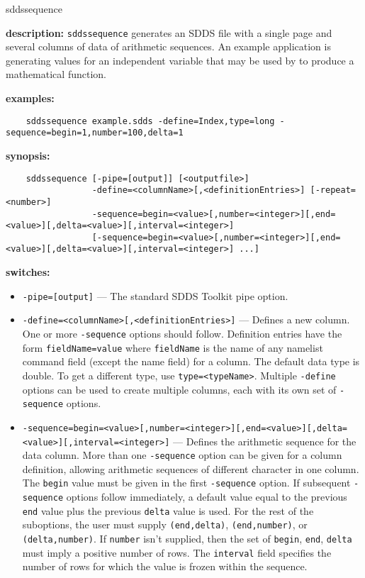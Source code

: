 \begin{sddsprog}{sddssequence}
  \item \textbf{description:} \verb|sddssequence| generates an SDDS file with a single page and several columns of data of arithmetic sequences. An example application is generating values for an independent variable that may be used by  to produce a mathematical function.
  \item \textbf{examples:}
    \begin{verbatim}
    sddssequence example.sdds -define=Index,type=long -sequence=begin=1,number=100,delta=1
    \end{verbatim}
  \item \textbf{synopsis:}
    \begin{verbatim}
    sddssequence [-pipe=[output]] [<outputfile>]
                 -define=<columnName>[,<definitionEntries>] [-repeat=<number>]
                 -sequence=begin=<value>[,number=<integer>][,end=<value>][,delta=<value>][,interval=<integer>]
                 [-sequence=begin=<value>[,number=<integer>][,end=<value>][,delta=<value>][,interval=<integer>] ...]
    \end{verbatim}
  \item \textbf{switches:}
    \begin{itemize}
      \item \verb|-pipe=[output]| --- The standard SDDS Toolkit pipe option.
      \item \verb|-define=<columnName>[,<definitionEntries>]| --- Defines a new column. One or more \verb|-sequence| options should follow. Definition entries have the form \verb|fieldName=value| where \verb|fieldName| is the name of any namelist command field (except the name field) for a column. The default data type is double. To get a different type, use \verb|type=<typeName>|. Multiple \verb|-define| options can be used to create multiple columns, each with its own set of \verb|-sequence| options.
      \item \verb|-sequence=begin=<value>[,number=<integer>][,end=<value>][,delta=<value>][,interval=<integer>]| --- Defines the arithmetic sequence for the data column. More than one \verb|-sequence| option can be given for a column definition, allowing arithmetic sequences of different character in one column. The \verb|begin| value must be given in the first \verb|-sequence| option. If subsequent \verb|-sequence| options follow immediately, a default value equal to the previous \verb|end| value plus the previous \verb|delta| value is used. For the rest of the suboptions, the user must supply \verb|(end,delta)|, \verb|(end,number)|, or \verb|(delta,number)|. If \verb|number| isn't supplied, then the set of \verb|begin|, \verb|end|, \verb|delta| must imply a positive number of rows. The \verb|interval| field specifies the number of rows for which the value is frozen within the sequence.

\end{itemize}
\end{sddsprog}
